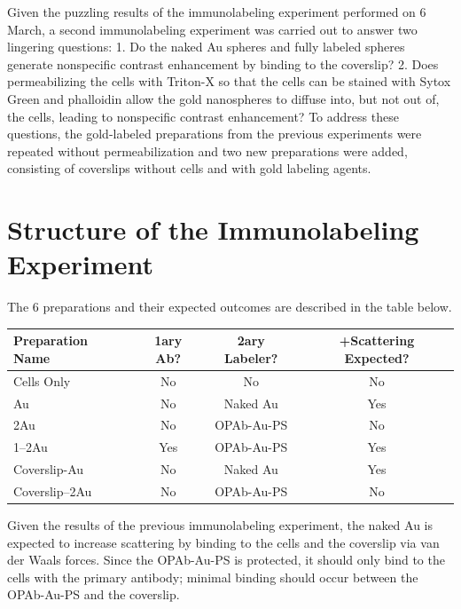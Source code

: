 Given the puzzling results of the immunolabeling experiment performed on 6 March, a second immunolabeling experiment was carried out to answer two lingering questions:
1. Do the naked Au spheres and fully labeled spheres generate nonspecific contrast enhancement by binding to the coverslip?
2. Does permeabilizing the cells with Triton-X so that the cells can be stained with Sytox Green and phalloidin allow the gold nanospheres to diffuse into, but not out of, the cells, leading to nonspecific contrast enhancement?
To address these questions, the gold-labeled preparations from the previous experiments were repeated without permeabilization and two new preparations were added, consisting of coverslips without cells and with gold labeling agents.

\section{Structure of the Immunolabeling Experiment}
\label{structureoftheimmunolabelingexperiment}

The 6 preparations and their expected outcomes are described in the table below.

\begin{table}[htbp]
\begin{minipage}{\linewidth}
\setlength{\tymax}{0.5\linewidth}
\centering
\small
\begin{tabular}{lccc} \toprule
Preparation Name&1ary Ab?&2ary Labeler?&+Scattering Expected?\\
\midrule
Cells Only&No&No&No\\
Au&No&Naked Au&Yes\\
2Au&No&OPAb-Au-PS&No\\
1--2Au&Yes&OPAb-Au-PS&Yes\\
Coverslip-Au&No&Naked Au&Yes\\
Coverslip--2Au&No&OPAb-Au-PS&No\\

\bottomrule

\end{tabular}
\end{minipage}
\end{table}


Given the results of the previous immunolabeling experiment, the naked Au is expected to increase scattering by binding to the cells and the coverslip via van der Waals forces. Since the OPAb-Au-PS is protected, it should only bind to the cells with the primary antibody; minimal binding should occur between the OPAb-Au-PS and the coverslip. 

